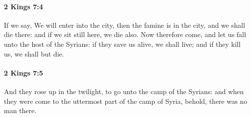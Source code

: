 		\paragraph{2 Kings 7:4} %
			\label{2KINGS-7-4}

			If we say, We will enter into the city, then the famine is in the city, and we shall die there: and if we sit still here, we die also. Now therefore come, and let us fall unto the host of the Syrians: if they save us alive, we shall live; and if they kill us, we shall but die.


		\paragraph{2 Kings 7:5} %
			\label{2KINGS-7-5}

			And they rose up in the twilight, to go unto the camp of the Syrians: and when they were come to the uttermost part of the camp of Syria, behold, there was no man there.

